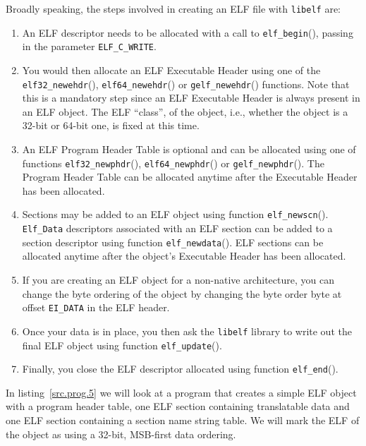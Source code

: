 \documentclass[a4paper]{book}
\newcommand{\constant}[1]{\texttt{#1}}
\newcommand{\function}[1]{\texttt{#1}()}
\newcommand{\library}[1]{\texttt{#1}}
\newcommand{\type}[1]{\texttt{#1}}
\begin{document}
Broadly speaking, the steps involved in creating an ELF file with
\library{libelf} are:
\begin{enumerate}
\item An ELF descriptor needs to be allocated with a call to
  \function{elf\_begin}, passing in the parameter
  \constant{ELF\_C\_WRITE}.
\item You would then allocate an ELF Executable Header using one of
  the \function{elf32\_newehdr}, \function{elf64\_newehdr} or
  \function{gelf\_newehdr} functions.  Note that this is a mandatory
  step since an ELF Executable Header is always present in an ELF
  object.  The ELF ``class'', of the object, i.e., whether the object
  is a 32-bit or 64-bit one, is fixed at this time.
\item An ELF Program Header Table is optional and can be allocated
  using one of functions \function{elf32\_newphdr},
  \function{elf64\_newphdr} or \function{gelf\_newphdr}.  The Program
  Header Table can be allocated anytime after the Executable Header
  has been allocated.
\item Sections may be added to an ELF object using function
  \function{elf\_newscn}.  \type{Elf\_Data} descriptors associated
  with an ELF section can be added to a section descriptor using
  function \function{elf\_newdata}. ELF sections can be allocated
  anytime after the object's Executable Header has been allocated.
\item If you are creating an ELF object for a non-native architecture,
  you can change the byte ordering of the object by changing the byte
  order byte at offset \constant{EI\_DATA} in the ELF header.
\item Once your data is in place, you then ask the \library{libelf}
  library to write out the final ELF object using function
  \function{elf\_update}.
\item Finally, you close the ELF descriptor allocated using function
  \function{elf\_end}.
\end{enumerate}

In listing~\vref{src.prog.5} we will look at a program that creates a
simple ELF object with a program header table, one ELF section
containing translatable data and one ELF section containing a section
name string table.  We will mark the ELF of the object as using a
32-bit, MSB-first data ordering.
\end{document}
